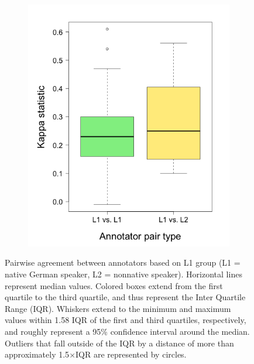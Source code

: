 \begin{figure}[h!]
\begin{subfigure}{.5\textwidth}
				\includegraphics[width=\textwidth]{img/plots/pairwiseKappaByL1-noTitle}
				\label{fig:agreement:L1:k}
			\end{subfigure}%
			
			\caption[Pairwise agreement statistics by annotator L1 group]{Pairwise agreement between annotators based on L1 group (L1 = native German speaker, L2 = nonnative speaker). 
			Horizontal lines represent median values. Colored boxes extend from the first quartile to the third quartile, and thus represent the Inter Quartile Range (IQR). Whiskers extend to the minimum and maximum values within 1.58 IQR of the first and third quartiles, respectively, and roughly represent a 95\% confidence interval around the median. 
			 Outliers that fall outside of the IQR by a distance of more than approximately 1.5$\times$IQR  are represented by circles.
			}
			\label{fig:agreement:L1}
		\end{figure}
		
		

